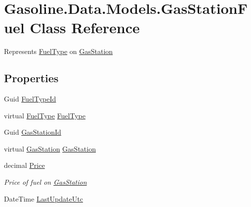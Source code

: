 \hypertarget{class_gasoline_1_1_data_1_1_models_1_1_gas_station_fuel}{}\section{Gasoline.\+Data.\+Models.\+Gas\+Station\+Fuel Class Reference}
\label{class_gasoline_1_1_data_1_1_models_1_1_gas_station_fuel}


Represents \mbox{\hyperlink{class_gasoline_1_1_data_1_1_models_1_1_fuel_type}{Fuel\+Type}} on \mbox{\hyperlink{class_gasoline_1_1_data_1_1_models_1_1_gas_station}{Gas\+Station}}  


\subsection*{Properties}
\begin{DoxyCompactItemize}
\item 
Guid \mbox{\hyperlink{class_gasoline_1_1_data_1_1_models_1_1_gas_station_fuel_a0b521fde2963819e40c89759bded73a7}{Fuel\+Type\+Id}}
\item 
virtual \mbox{\hyperlink{class_gasoline_1_1_data_1_1_models_1_1_fuel_type}{Fuel\+Type}} \mbox{\hyperlink{class_gasoline_1_1_data_1_1_models_1_1_gas_station_fuel_a286a6116abf8b3cfbbabcdd01edd1c34}{Fuel\+Type}}
\item 
Guid \mbox{\hyperlink{class_gasoline_1_1_data_1_1_models_1_1_gas_station_fuel_acf4bc5817e46269974cee1455477ac11}{Gas\+Station\+Id}}
\item 
virtual \mbox{\hyperlink{class_gasoline_1_1_data_1_1_models_1_1_gas_station}{Gas\+Station}} \mbox{\hyperlink{class_gasoline_1_1_data_1_1_models_1_1_gas_station_fuel_a469eb503913a1477ebf69fb691148f1c}{Gas\+Station}}
\item 
decimal \mbox{\hyperlink{class_gasoline_1_1_data_1_1_models_1_1_gas_station_fuel_a856b3172ec142f6f7e780f40ae173fc8}{Price}}
\begin{DoxyCompactList}\small\item\em Price of fuel on \mbox{\hyperlink{class_gasoline_1_1_data_1_1_models_1_1_gas_station}{Gas\+Station}} \end{DoxyCompactList}\item 
Date\+Time \mbox{\hyperlink{class_gasoline_1_1_data_1_1_models_1_1_gas_station_fuel_af218d454639266aaf61825b6026c218e}{Last\+Update\+Utc}}
\end{DoxyCompactItemize}


